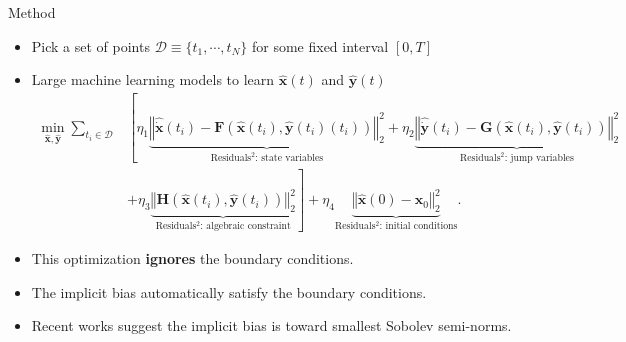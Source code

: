 \documentclass[aspectratio=169,10pt]{beamer}
\newcommand{\emphcolor}[1]{\textbf{\textcolor{emphcolorval}{#1}}}
\begin{document}
\begin{frame}{Method}
	\begin{itemize}
		\item Pick a set of points $\mathcal{D}\equiv \{t_1,\cdots,t_N\}$ for some fixed interval $[0,T]$
		\vspace{0.1in}
		\item Large machine learning models to learn $\hat{\mathbf{x}}(t)$ and $\hat{\mathbf{y}}(t)$
	\begin{align*}
		\min_{\hat{\mathbf{x}}, \hat{\mathbf{y}}} \sum_{t_i \in \mathcal{D}} &\left[\eta_1  \underbrace{\left\Vert\hat{\dot{\mathbf{x}}}(t_i) 
		- \mathbf{F}(\hat{\mathbf{x}}(t_i), \hat{\mathbf{y}}(t_i)(t_i))\right\Vert_2^2}_{\text{Residuals$^2$: state variables}}  + \eta_2  \underbrace{\left\Vert\hat{\dot{\mathbf{y}}}(t_i) -  \mathbf{G}(\hat{\mathbf{x}}(t_i), \hat{\mathbf{y}}(t_i))\right\Vert_2^2}_{\text{Residuals$^2$: jump variables}} \right.\nonumber\\
		&\left.+ \eta_3  \underbrace{\left\Vert\mathbf{H}(\hat{\mathbf{x}}(t_i), \hat{\mathbf{y}}(t_i))\right\Vert_2^2}_{\text{Residuals$^2$: algebraic constraint}} \right]  + \eta_4  \underbrace{\left\Vert\hat{\mathbf{x}}(0) - \mathbf{x}_0\right\Vert_2^2}_{\text{Residuals$^2$: initial conditions}} .
	\end{align*}
	
	\item This optimization \emphcolor{ignores} the boundary conditions.
	 \vspace{0.1in}
	\item The implicit bias automatically satisfy the boundary conditions.
	\vspace{0.1in}
	\item Recent works suggest the implicit bias is toward smallest Sobolev semi-norms.
		\end{itemize}
\end{frame}
\end{document}
